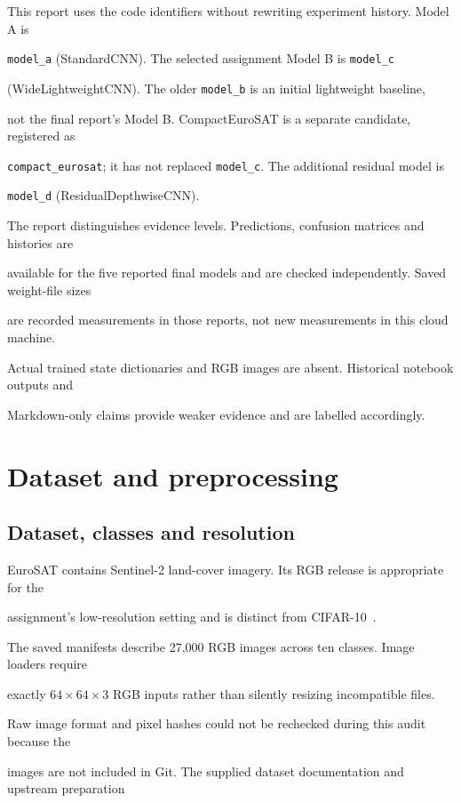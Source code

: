 \documentclass[11pt,a4paper]{article}
\DeclareRobustCommand{\code}[1]{\nolinkurl{#1}}
\begin{document}
This report uses the code identifiers without rewriting experiment history. Model A is

\code{model_a} (StandardCNN). The selected assignment Model B is \code{model_c}

(WideLightweightCNN). The older \code{model_b} is an initial lightweight baseline,

not the final report's Model B. CompactEuroSAT is a separate candidate, registered as

\code{compact_eurosat}; it has not replaced \code{model_c}. The additional residual model is

\code{model_d} (ResidualDepthwiseCNN).



The report distinguishes evidence levels. Predictions, confusion matrices and histories are

available for the five reported final models and are checked independently. Saved weight-file sizes

are recorded measurements in those reports, not new measurements in this cloud machine.

Actual trained state dictionaries and RGB images are absent. Historical notebook outputs and

Markdown-only claims provide weaker evidence and are labelled accordingly.



\section{Dataset and preprocessing}

\subsection{Dataset, classes and resolution}

EuroSAT contains Sentinel-2 land-cover imagery. Its RGB release is appropriate for the

assignment's low-resolution setting and is distinct from CIFAR-10~\cite{eurosat}.

The saved manifests describe 27,000 RGB images across ten classes. Image loaders require

exactly $64\times64\times3$ RGB inputs rather than silently resizing incompatible files.

Raw image format and pixel hashes could not be rechecked during this audit because the

images are not included in Git. The supplied dataset documentation and upstream preparation
\end{document}
